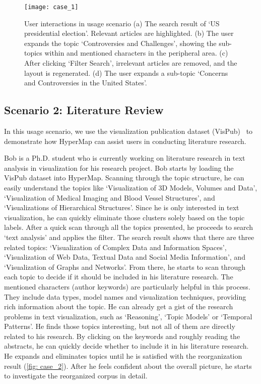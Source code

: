 \begin{figure}%
    \centering
    \texttt{[image: case\_1]}
    \caption{User interactions in usage scenario 
    (a) The search result of `US presidential election'. Relevant articles are highlighted.
    (b) The user expands the topic `Controversies and Challenges', showing the sub-topics within and mentioned characters in the peripheral area.
    (c) After clicking `Filter Search', irrelevant articles are removed, and the layout is regenerated.
    (d) The user expands a sub-topic `Concerns and Controversies in the United States'.
    }%
    \label{fig: case_1}%
\end{figure}
\subsection{Scenario 2: Literature Review}
In this usage scenario, we use the visualization publication dataset (VisPub)~\cite{vispub} to demonstrate how HyperMap can assist users in conducting literature research.

Bob is a Ph.D. student who is currently working on literature research in text analysis in visualization for his research project.
Bob starts by loading the VisPub dataset into HyperMap. 
Scanning through the topic structure, he can easily understand the topics like `Visualization of 3D Models, Volumes and Data', `Visualization of Medical Imaging and Blood Vessel Structures', and `Visualizations of Hierarchical Structures'.
Since he is only interested in text visualization, he can quickly eliminate those clusters solely based on the topic labels.
After a quick scan through all the topics presented, he proceeds to search `text analysis' and applies the filter.
The search result shows that there are three related topics: `Visualization of Complex Data and Information Spaces', `Visualization of Web Data, Textual Data and Social Media Information', and `Visualization of Graphs and Networks'.
From there, he starts to scan through each topic to decide if it should be included in his literature research.
The mentioned characters (author keywords) are particularly helpful in this process.
They include data types, model names and visualization techniques, providing rich information about the topic.
He can already get a gist of the research problems in text visualization, such as `Reasoning', `Topic Models' or `Temporal Patterns'.
He finds those topics interesting, but not all of them are directly related to his research.
By clicking on the keywords and roughly reading the abstracts, he can quickly decide whether to include it in his literature research. 
He expands and eliminates topics until he is satisfied with the reorganization result (\autoref{fig: case_2}).
After he feels confident about the overall picture, he starts to investigate the reorganized corpus in detail.

